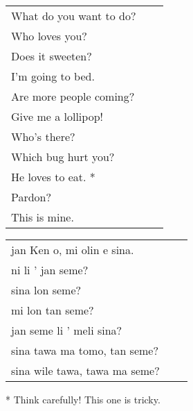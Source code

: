 \begin{supertabular}{p{5,5cm}|ll}
    What do you want to do? &  & \\
    Who loves you?          &  & \\
    Does it sweeten?        &  & \\
    I'm going to bed.       &  & \\
    Are more people coming? &  & \\
    Give me a lollipop!     &  & \\
    Who's there?            &  & \\
    Which bug hurt you?     &  & \\
    He loves to eat. *      &  & \\
    Pardon?                 &  & \\
    This is mine.           &  & \\
\end{supertabular}

\begin{supertabular}{p{5,5cm}|ll}
    jan Ken o, mi olin e sina.     &  & \\
    ni li ' jan seme?              &  & \\
    sina lon seme?                 &  & \\
    mi lon tan seme?               &  & \\
    jan seme li ' meli sina?       &  & \\
    sina tawa ma tomo, tan seme?   &  & \\
    sina wile tawa, tawa  ma seme? &  & \\
\end{supertabular}

* Think carefully! This one is tricky.
